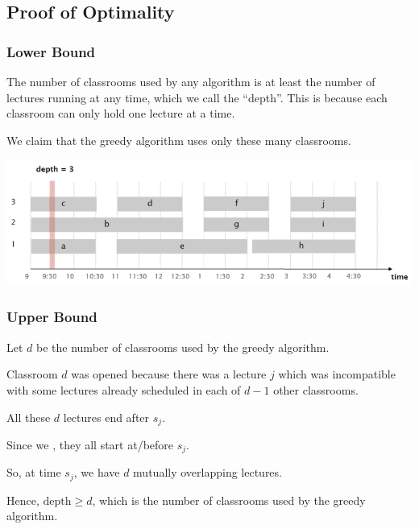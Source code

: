 \subsection{Proof of Optimality}

\subsubsection{Lower Bound}

The number of classrooms used by any algorithm is at least the number of lectures running at any time, which we call the ``depth''. This is because each classroom can only hold one lecture at a time.

We claim that the greedy algorithm uses only these many classrooms.

\begin{center}
    \includegraphics[width=0.75\linewidth]{figures/interval-scheduling-lower-bound.png}
\end{center}

\subsubsection{Upper Bound}

\begin{listu}
    \item Let $d$ be the number of classrooms used by the greedy algorithm.

    \item Classroom $d$ was opened because there was a lecture $j$ which was incompatible with some lectures already scheduled in each of $d - 1$ other classrooms.

    \item All these $d$ lectures end after $s_j$.

    Since we , they all start at/before $s_j$.

    \item So, at time $s_j$, we have $d$ mutually overlapping lectures.

    \item Hence, $\text{depth} \ge d$, which is the number of classrooms used by the greedy algorithm.
\end{listu}

